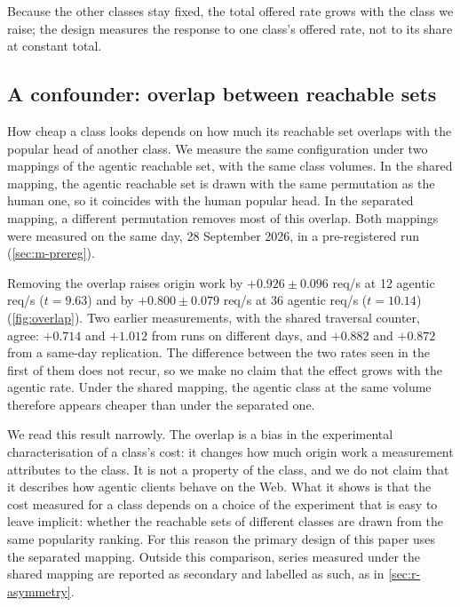 Because the other classes stay fixed, the total offered rate grows with the class we
raise; the design measures the response to one class's offered rate, not to its share at
constant total.

\subsection{A confounder: overlap between reachable sets}\label{sec:r-overlap}
How cheap a class looks depends on how much its reachable set overlaps with the popular
head of another class.
We measure the same configuration under two mappings of the agentic reachable set, with
the same class volumes.
In the shared mapping, the agentic reachable set is drawn with the same permutation as the
human one, so it coincides with the human popular head.
In the separated mapping, a different permutation removes most of this
overlap.
Both mappings were measured on the same day, 28 September 2026, in a pre-registered run
(\cref{sec:m-prereg}).

Removing the overlap raises origin work by $+0.926 \pm 0.096$ req/s at 12 agentic req/s
($t = 9.63$) and by $+0.800 \pm 0.079$ req/s at 36 agentic req/s ($t = 10.14$)
(\cref{fig:overlap}).
Two earlier measurements, with the shared traversal counter, agree: $+0.714$ and $+1.012$
from runs on different days, and $+0.882$ and $+0.872$ from a same-day
replication.
The difference between the two rates seen in the first of them does not recur, so we make
no claim that the effect grows with the agentic rate.
Under the shared mapping, the agentic class at the same volume therefore appears cheaper
than under the separated one.

We read this result narrowly.
The overlap is a bias in the experimental characterisation of a class's cost: it changes
how much origin work a measurement attributes to the class.
It is not a property of the class, and we do not claim that it describes how agentic
clients behave on the Web.
What it shows is that the cost measured for a class depends on a choice of the
experiment that is easy to leave implicit: whether the reachable sets of different classes
are drawn from the same popularity ranking.
For this reason the primary design of this paper uses the separated
mapping.
Outside this comparison, series measured under the shared mapping are reported as
secondary and labelled as such, as in \cref{sec:r-asymmetry}.

